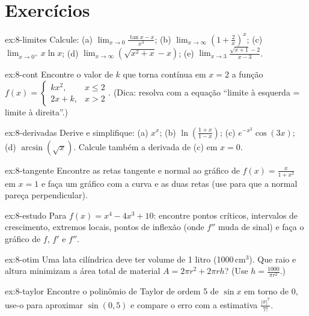 \section{Exercícios}

\begin{exercicio}[limites]{ex:8-limites}
Calcule: (a) $\displaystyle\lim_{x\to0}\frac{\tan x - x}{x^3}$; (b) $\displaystyle\lim_{x\to\infty}\left(1+\frac{2}{x}\right)^{x}$;
(c) $\displaystyle\lim_{x\to 0^+}x\ln x$; (d) $\displaystyle\lim_{x\to\infty}\left(\sqrt{x^2+x}-x\right)$;
(e) $\displaystyle\lim_{x\to3}\frac{\sqrt{x+1}-2}{x-3}$.
\end{exercicio}

\begin{exercicio}[continuidade]{ex:8-cont}
Encontre o valor de $k$ que torna contínua em $x=2$ a função
$f(x)=\begin{cases}kx^2, & x\le2\\ 2x+k, & x>2\end{cases}$. (Dica: resolva com  a equação
``limite à esquerda = limite à direita''.)
\end{exercicio}

\begin{exercicio}[derivadas]{ex:8-derivadas}
Derive e simplifique: (a) $x^x$; (b) $\ln\!\left(\frac{1+x}{1-x}\right)$; (c) $e^{-x^2}\cos(3x)$;
(d) $\arcsin(\sqrt{x})$. Calcule também a derivada de (c) em $x=0$.
\end{exercicio}

\begin{exercicio}{ex:8-tangente}
Encontre as retas tangente e normal ao gráfico de $f(x)=\frac{x}{1+x^2}$ em $x=1$ e faça um gráfico com a curva e
as duas retas (use  para que a normal pareça perpendicular).
\end{exercicio}

\begin{exercicio}{ex:8-estudo}
Para $f(x)=x^4-4x^3+10$: encontre pontos críticos, intervalos de crescimento, extremos locais, pontos de
inflexão (onde $f''$ muda de sinal) e faça o gráfico de $f$, $f'$ e $f''$.
\end{exercicio}

\begin{exercicio}[otimização]{ex:8-otim}
Uma lata cilíndrica deve ter volume de 1 litro (1000\,cm$^3$). Que raio e altura minimizam a área total de
material $A=2\pi r^2+2\pi r h$? (Use $h=\frac{1000}{\pi r^2}$.)
\end{exercicio}

\begin{exercicio}{ex:8-taylor}
Encontre o polinômio de Taylor de ordem 5 de $\sin x$ em torno de 0, use-o para aproximar $\sin(0{,}5)$ e
compare o erro com a estimativa $\frac{|x|^7}{7!}$.
\end{exercicio}

